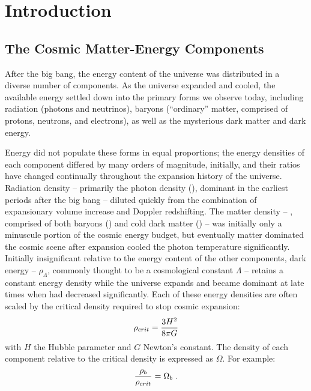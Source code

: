 
\chapter{Introduction}
\label{chap:Intro}
\section{The Cosmic Matter-Energy Components}
\label{sec:Intro.Components}
After the big bang, the energy content of the universe was distributed
in a diverse number of components. As the universe expanded and
cooled, the available energy settled down into the primary forms we
observe today, including radiation (photons and neutrinos), baryons
(``ordinary'' matter, comprised of protons, neutrons, and electrons),
as well as the mysterious dark matter and dark energy.

Energy did not populate these forms in equal proportions; the energy
densities of each component differed by many orders of magnitude,
initially, and their ratios have changed continually throughout the
expansion history of the universe. Radiation density -- primarily the
photon density (\rhog), dominant in the earliest periods after the big
bang -- diluted quickly from the combination of expansionary volume
increase and Doppler redshifting. The matter density -- \rhom,
comprised of both baryons (\rhob) and cold dark matter (\rhoc) -- was
initially only a minuscule portion of the cosmic energy budget, but
eventually matter dominated the cosmic scene after expansion
cooled the photon temperature significantly. Initially
insignificant relative to the energy content of the other components,
dark energy -- $\rho_\Lambda$, commonly thought to be a cosmological
constant $\Lambda$ -- retains a constant energy density while the
universe expands and became dominant at late times when \rhom{} had
decreased significantly. Each of these energy densities are often
scaled by the critical density required to stop cosmic expansion:
\begin{equation}
\rho_{crit} = \frac{3H^2}{8\pi{}G} 
\end{equation}
with $H$ the Hubble parameter and $G$ Newton's constant. The density of each component relative to the critical
density is expressed as $\Omega$. For example:
\begin{equation}
\frac{\rho_b}{\rho_{crit}} = \Omega_b\;.
\end{equation}


